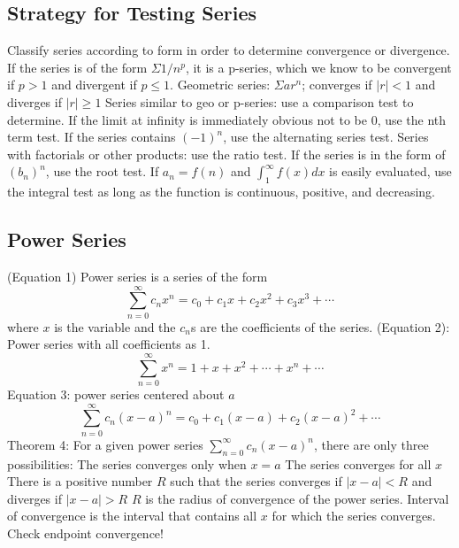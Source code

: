 \documentclass{article}
\begin{document}
    \subsection{Strategy for Testing Series}
    \begin{outline}
        \1 Classify series according to form in order to determine convergence or divergence. 
        \1 If the series is of the form \(\Sigma 1/n^p\), it is a p-series, which we know to be convergent if \(p>1\) and divergent if \(p\leq 1\).
        \1 Geometric series: \(\Sigma ar^n\); converges if \(|r|<1\) and diverges if \(|r|\geq 1\)
        \1 Series similar to geo or p-series: use a comparison test to determine. 
        \1 If the limit at infinity is immediately obvious not to be 0, use the nth term test. 
        \1 If the series contains \((-1)^n\), use the alternating series test. 
        \1 Series with factorials or other products: use the ratio test. 
        \1 If the series is in the form of \((b_n)^n\), use the root test. 
        \1 If \(a_n=f(n)\) and \(\int^\infty_1f(x)dx\) is easily evaluated, use the integral test as long as the function is continuous, positive, and decreasing. 

    \end{outline}

    \subsection{Power Series}
    \begin{outline}
        \1 (Equation 1) Power series is a series of the form \[\sum^\infty_{n=0}c_nx^n=c_0+c_1x+c_2x^2+c_3x^3+\cdots\] where $x$ is the variable and the $c_n$s are the coefficients of the series. 
        \1 (Equation 2): Power series with all coefficients as 1. \[\sum^\infty_{n=0}x^n=1+x+x^2+\cdots+x^n+\cdots\]
        \1 Equation 3: power series centered about $a$ \[\sum^\infty_{n=0}c_n(x-a)^n=c_0+c_1(x-a)+c_2(x-a)^2+\cdots\]
        \1 Theorem 4: For a given power series \(\sum^\infty_{n=0}c_n(x-a)^n\), there are only three possibilities: 
            \2 The series converges only when \(x=a\)
            \2 The series converges for all $x$
            \2 There is a positive number $R$ such that the series converges if \(|x-a|<R\) and diverges if \(|x-a|>R\)
        \1 $R$ is the radius of convergence of the power series. Interval of convergence is the interval that contains all $x$ for which the series converges. 
        \1 Check endpoint convergence!

    \end{outline}
\end{document}
